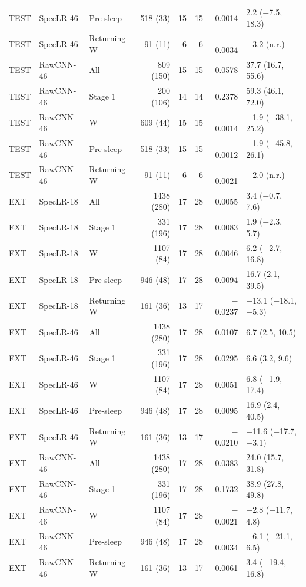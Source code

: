 {{\begin{longtable}{@{}lllrrrrl@{}}
TEST & SpecLR-46 & Pre-sleep & 518 (33) & 15 & 15 & 0.0014 & 2.2 ($-$7.5, 18.3) \\
TEST & SpecLR-46 & Returning W & 91 (11) & 6 & 6 & $-$0.0034 & $-$3.2 (n.r.) \\
\addlinespace[1pt]
TEST & RawCNN-46 & All & 809 (150) & 15 & 15 & 0.0578 & 37.7 (16.7, 55.6) \\
TEST & RawCNN-46 & Stage 1 & 200 (106) & 14 & 14 & 0.2378 & 59.3 (46.1, 72.0) \\
TEST & RawCNN-46 & W & 609 (44) & 15 & 15 & $-$0.0014 & $-$1.9 ($-$38.1, 25.2) \\
TEST & RawCNN-46 & Pre-sleep & 518 (33) & 15 & 15 & $-$0.0012 & $-$1.9 ($-$45.8, 26.1) \\
TEST & RawCNN-46 & Returning W & 91 (11) & 6 & 6 & $-$0.0021 & $-$2.0 (n.r.) \\
\addlinespace[1pt]
EXT & SpecLR-18 & All & 1438 (280) & 17 & 28 & 0.0055 & 3.4 ($-$0.7, 7.6) \\
EXT & SpecLR-18 & Stage 1 & 331 (196) & 17 & 28 & 0.0083 & 1.9 ($-$2.3, 5.7) \\
EXT & SpecLR-18 & W & 1107 (84) & 17 & 28 & 0.0046 & 6.2 ($-$2.7, 16.8) \\
EXT & SpecLR-18 & Pre-sleep & 946 (48) & 17 & 28 & 0.0094 & 16.7 (2.1, 39.5) \\
EXT & SpecLR-18 & Returning W & 161 (36) & 13 & 17 & $-$0.0237 & $-$13.1 ($-$18.1, $-$5.3) \\
\addlinespace[1pt]
EXT & SpecLR-46 & All & 1438 (280) & 17 & 28 & 0.0107 & 6.7 (2.5, 10.5) \\
EXT & SpecLR-46 & Stage 1 & 331 (196) & 17 & 28 & 0.0295 & 6.6 (3.2, 9.6) \\
EXT & SpecLR-46 & W & 1107 (84) & 17 & 28 & 0.0051 & 6.8 ($-$1.9, 17.4) \\
EXT & SpecLR-46 & Pre-sleep & 946 (48) & 17 & 28 & 0.0095 & 16.9 (2.4, 40.5) \\
EXT & SpecLR-46 & Returning W & 161 (36) & 13 & 17 & $-$0.0210 & $-$11.6 ($-$17.7, $-$3.1) \\
\addlinespace[1pt]
EXT & RawCNN-46 & All & 1438 (280) & 17 & 28 & 0.0383 & 24.0 (15.7, 31.8) \\
EXT & RawCNN-46 & Stage 1 & 331 (196) & 17 & 28 & 0.1732 & 38.9 (27.8, 49.8) \\
EXT & RawCNN-46 & W & 1107 (84) & 17 & 28 & $-$0.0021 & $-$2.8 ($-$11.7, 4.8) \\
EXT & RawCNN-46 & Pre-sleep & 946 (48) & 17 & 28 & $-$0.0034 & $-$6.1 ($-$21.1, 6.5) \\
EXT & RawCNN-46 & Returning W & 161 (36) & 13 & 17 & 0.0061 & 3.4 ($-$19.4, 16.8) \\
\bottomrule
\end{longtable}}}

